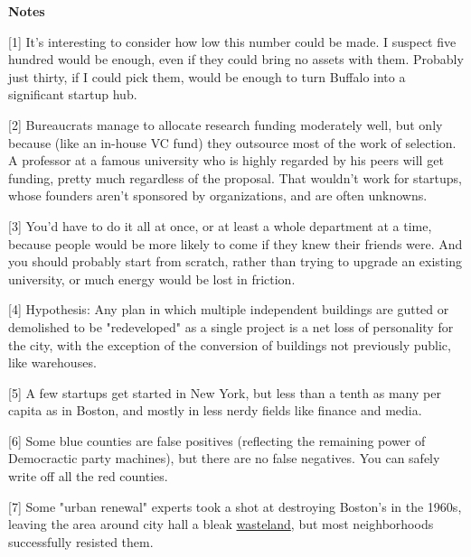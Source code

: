 \textbf{Notes}

[1] It's interesting to consider how low this number could be
                  made. I suspect five hundred would be enough, even if they
                  could bring no assets with them. Probably just thirty, if I
                  could pick them, would be enough to turn Buffalo into a
                  significant startup hub.

[2] Bureaucrats manage to allocate research funding moderately
                  well, but only because (like an in-house VC fund) they
                  outsource most of the work of selection. A professor at a
                  famous university who is highly regarded by his peers will get
                  funding, pretty much regardless of the proposal. That wouldn't
                  work for startups, whose founders aren't sponsored by
                  organizations, and are often unknowns.

[3] You'd have to do it all at once, or at least a whole
                  department at a time, because people would be more likely to
                  come if they knew their friends were. And you should probably
                  start from scratch, rather than trying to upgrade an existing
                  university, or much energy would be lost in friction.

[4] Hypothesis: Any plan in which multiple independent
                  buildings are gutted or demolished to be "redeveloped" as a
                  single project is a net loss of personality for the city, with
                  the exception of the conversion of buildings not previously
                  public, like warehouses.

[5] A few startups get started in New York, but less than a
                  tenth as many per capita as in Boston, and mostly in less
                  nerdy fields like finance and media.

[6] Some blue counties are false positives (reflecting the
                  remaining power of Democractic party machines), but there are
                  no false negatives. You can safely write off all the red
                  counties.

[7] Some "urban renewal" experts took a shot at destroying
                  Boston's in the 1960s, leaving the area around city hall a
                  bleak
                  \href{http://www.pps.org/great\_public\_spaces/one?public\_place\_id=148}{wasteland}, but most neighborhoods successfully resisted them.

